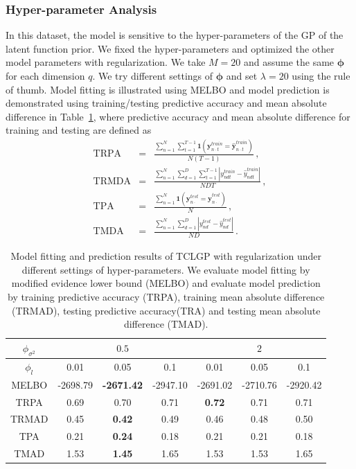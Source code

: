 \documentclass{article}
\begin{document}
\subsubsection{Hyper-parameter Analysis}
In this dataset, the model is sensitive to the hyper-parameters of the GP of the latent function prior. We fixed the hyper-parameters and optimized the other model parameters with regularization. We take $M = 20$ and assume the same $\bm \phi$ for each dimension $q$. We try different settings of $\bm \phi$ and set $\lambda =20$ using  the rule of thumb. Model fitting is illustrated using MELBO and model prediction is demonstrated using training/testing predictive accuracy and  mean absolute difference in Table~\ref{tab:STOCK}, where predictive accuracy and mean absolute difference for training and testing are defined as 
\begin{eqnarray}
\mathrm{TRPA} & = & \frac{\sum_{n = 1}^{N}\sum_{t = 1}^{T-1}\bm 1(\bm y^{train}_{n\cdot t} = \hat{\bm y}^{train}_{n\cdot t})}{N(T-1)} \,, \nonumber \\
\mathrm{TRMDA} & = & \frac{\sum_{n = 1}^{N}\sum_{d = 1}^{D}\sum_{t=1}^{T-1}|y^{train}_{ndt}-\hat{y}^{train}_{ndt}|}{NDT} \,, \nonumber \\
\mathrm{TPA} & = & \frac{\sum_{n = 1}^{N}\bm 1(\bm y^{test}_{n\cdot} = \hat{\bm y}^{test}_{n\cdot})}{N} \,, \nonumber \\
\mathrm{TMDA} & = & \frac{\sum_{n = 1}^{N}\sum_{d = 1}^{D}|y^{test}_{nd}-\hat{y}^{test}_{nd}|}{ND} \,. \nonumber
\end{eqnarray} 

\begin{table}[ht!]
	\centering
	\begin{tabular}{|c|c|c|c|c|c|c|}
		\hline
		$\phi_{\sigma^2}$ & \multicolumn{3}{|c|}{$0.5$} & \multicolumn{3}{|c|}{$2$} \\
		\hline
		$\phi_l$ & 0.01 & 0.05 & 0.1 & 0.01 & 0.05 & 0.1  \\
		\hline
		MELBO & -2698.79 & \textbf{-2671.42} & -2947.10 & -2691.02 & -2710.76 & -2920.42\\
		\hline
		TRPA & 0.69 & 0.70 & 0.71 & \textbf{0.72} & 0.71 & 0.71  \\
		\hline
		TRMAD & 0.45 & \textbf{0.42} & 0.49 & 0.46 & 0.48 & 0.50 \\
		\hline
		TPA  & 0.21 & \textbf{0.24} & 0.18 & 0.21 & 0.21 & 0.18 \\
		\hline
		TMAD & 1.53 & \textbf{1.45} & 1.65 & 1.53 & 1.53 & 1.65 \\
		\hline
	\end{tabular}
    \caption{Model fitting and prediction results of TCLGP with regularization under different settings of hyper-parameters. We evaluate model fitting by modified evidence lower bound (MELBO) and evaluate model prediction by training predictive accuracy (TRPA), training mean absolute difference (TRMAD), testing predictive accuracy(TRA) and testing mean absolute difference (TMAD).}
	\label{tab:STOCK}
\end{table}
\end{document}
